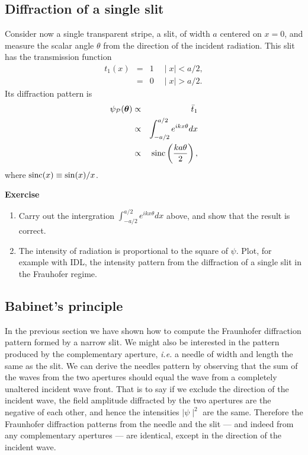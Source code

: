 \documentclass{article}
\newcommand{\bua}{\begin{eqnarray*}}
\newcommand{\eua}{\end{eqnarray*}}
\def\cl#1{{\cal #1}}               %
\def\labs{\mid\!}
\def\rabs{\!\mid}
\begin{document}
\subsection*{Diffraction of a single slit}

Consider now a single transparent stripe, a slit, of width $a$ centered on $x=0$, and 
measure the scalar angle $\theta$ from the direction of the incident radiation. This slit
has the transmission function 
\bua
t_1(x)&=&1\quad\labs x\rabs<{a/2}, \\
      &=&0\quad\labs x\rabs>{a/2}.
\eua
Its diffraction pattern is 
\bua
\psi_\cl{P}({\bm\theta})&\propto&\bar{t}_1 \\
                        &\propto&\int_{-{a/2}}^{a/2}e^{ikx\theta}dx \\
                        &\propto&{\rm sinc}\left({ka\theta\over 2}\right),
\eua
where ${\rm sinc}(x)\equiv{\sin(x)/x}$. 

{\bf Exercise}

\begin{enumerate}
\setcounter{enumi}{\value{count}}
\item Carry out the intergration $\int_{-{a/2}}^{a/2}e^{ikx\theta}dx$  above, and show that the result is correct. 
\item The intensity of radiation is proportional to the square of
  $\psi$. Plot, for example with {\sc IDL}, the intensity pattern from
  the diffraction of a single slit in the Frauhofer regime.
\setcounter{count}{\value{enumi}}
\end{enumerate}

\subsection*{Babinet's principle}

In the previous section we have shown how to compute the Fraunhofer diffraction pattern formed
by a narrow slit. We might also be interested in the pattern produced by the complementary
aperture, {\it i.e.} a needle of width and length the same as the slit. We can derive the 
needles pattern by observing that the sum of the waves from the two apertures should equal the
wave from a completely unaltered incident wave front. That is to say if we exclude the
direction of the incident wave, the field amplitude diffracted by the two apertures are the
negative of each other, and hence the intensities $\labs\psi\rabs^2$ are the same. 
Therefore the Fraunhofer diffraction patterns from the needle and the slit --- and indeed from
any complementary apertures --- are identical, except in the direction of the incident 
wave.
\end{document}
